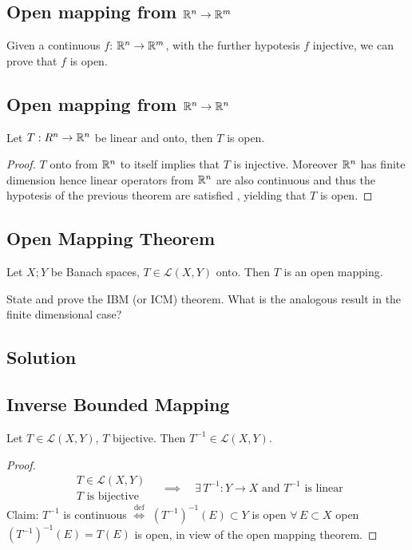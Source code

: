 \subsection{Open mapping from \texorpdfstring{$\mathbb{R}^n\rightarrow\mathbb{R}^m$}{Rn to Rm}}
Given a continuous $f$: $\mathbb{R}^n\rightarrow\mathbb{R}^m$,  with the further hypotesis $f$ injective, we can prove that $f$ is open.

\subsection{Open mapping from \texorpdfstring{$\mathbb{R}^n\rightarrow\mathbb{R}^n$}{Rn to Rn}}
Let $T: R^n\rightarrow\mathbb{R}^n$ be linear and onto, then $T$ is open.
\begin{proof}
    $T$ onto from $\mathbb{R}^n$ to itself implies that $T$  is injective.
    Moreover $\mathbb{R}^n$ has finite dimension hence linear operators from $\mathbb{R}^n$ are also continuous and thus the hypotesis of the previous theorem are satisfied , yielding  that $T$ is open.
\end{proof}

\subsection{Open Mapping Theorem}
Let $X;Y$ be Banach spaces, $T\in\mathcal{L}(X,Y)$ onto. Then $T$ is an open mapping.


\question
State and prove the IBM (or ICM) theorem. What is the analogous result in the finite dimensional case?

\subsection*{Solution}

\subsection{Inverse Bounded Mapping}
Let $T\in\mathcal{L}(X,Y)$, $T$ bijective. Then $T^{-1}\in\mathcal{L}(X,Y)$.
\begin{proof}
    \[\begin{array}{l}
        T\in\mathcal{L}(X,Y)\\
        T \mbox{ is bijective}
    \end{array}\quad\implies\quad \exists\, T^{-1}:Y\rightarrow X\mbox{ and } T^{-1} \mbox{ is linear}\]
    Claim: $T^{-1}$ is continuous $\overset{{\mbox{def}}}{\iff}$ $(T^{-1})^{-1}(E)\subset Y$ is open $\forall\,E\subset X$ open \\
    $(T^{-1})^{-1}(E)=T(E)$ is open, in view of the open mapping theorem.
\end{proof}

